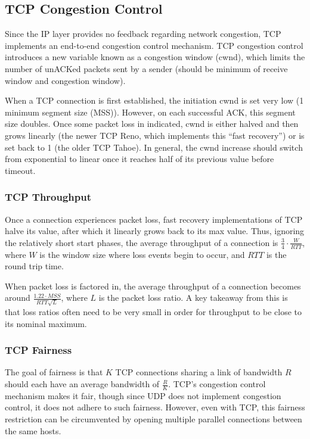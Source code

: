 \documentclass[12pt,titlepage]{article}
\begin{document}
    \subsection{TCP Congestion Control}
      Since the IP layer provides no feedback regarding network congestion, TCP implements an end-to-end congestion control mechanism. TCP congestion control introduces a new variable
      known as a congestion window (cwnd), which limits the number of unACKed packets sent by a sender (should be minimum of receive window and congestion window).

      When a TCP connection is first established, the initiation cwnd is set very low (1 minimum segment size (MSS)). However, on each successful ACK, this segment size doubles. Once some
      packet loss in indicated, cwnd is either halved and then grows linearly (the newer TCP Reno, which implements this ``fast recovery'') or is set back to 1 (the older TCP Tahoe).
      In general, the cwnd increase should switch from exponential to linear once it reaches half of its previous value before timeout.

      \subsubsection{TCP Throughput}
        Once a connection experiences packet loss, fast recovery implementations of TCP halve its value, after which it linearly grows back to its max value. Thus, ignoring the relatively
        short start phases, the average throughput of a connection is $\frac{3}{4} \cdot \frac{W}{RTT}$, where $W$ is the window size where loss events begin to occur, and $RTT$ is the
        round trip time.

        When packet loss is factored in, the average throughput of a connection becomes around $\frac{1.22 \cdot MSS}{RTT \sqrt{L}}$, where $L$ is the packet loss ratio. A key takeaway
        from this is that loss ratios often need to be very small in order for throughput to be close to its nominal maximum.

      \subsubsection{TCP Fairness}
        The goal of fairness is that $K$ TCP connections sharing a link of bandwidth $R$ should each have an average bandwidth of $\frac{R}{K}$. TCP's congestion control mechanism makes it
        fair, though since UDP does not implement congestion control, it does not adhere to such fairness. However, even with TCP, this fairness restriction can be circumvented by opening
        multiple parallel connections between the same hosts.
\end{document}
